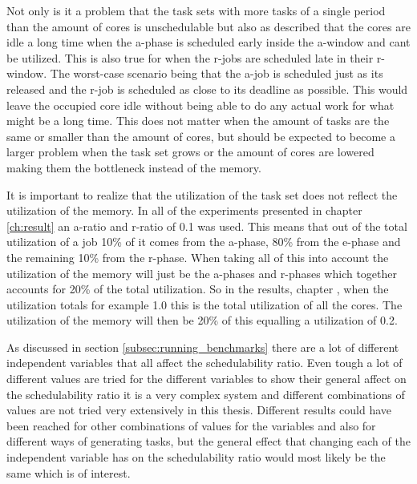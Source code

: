 \documentclass{kththesis}
\begin{document}
Not only is it a problem that the task sets with more tasks of a single period than the amount of
cores is unschedulable but also as described that the cores are idle a long time when the
\acrshort{a}-phase is scheduled early inside the \acrshort{a}-window and cant be utilized. This is
also true for when the \acrshort{r}-jobs are scheduled late in their \acrshort{r}-window. The
worst-case scenario being that the \acrshort{a}-job is scheduled just as its released and the
\acrshort{r}-job is scheduled as close to its deadline as possible. This would leave the occupied
core idle without being able to do any actual work for what might be a long time. This does not
matter when the amount of tasks are the same or smaller than the amount of cores, but should be
expected to become a larger problem when the task set grows or the amount of cores are lowered
making them the bottleneck instead of the memory.

It is important to realize that the utilization of the task set does not reflect the utilization of
the memory. In all of the experiments presented in chapter \ref{ch:result} an \acrshort{a}-ratio and
\acrshort{r}-ratio of 0.1 was used. This means that out of the total utilization of a job 10\% of it
comes from the \acrshort{a}-phase, 80\% from the \acrshort{e}-phase and the remaining 10\% from the
\acrshort{r}-phase. When taking all of this into account the utilization of the memory will just be
the \acrshort{a}-phases and \acrshort{r}-phases which together accounts for 20\% of the total
utilization. So in the results, chapter \label{ch:results}, when the utilization totals for
example 1.0 this is the total utilization of all the cores. The utilization of the memory will then
be 20\% of this equalling a utilization of 0.2.

As discussed in section \ref{subsec:running_benchmarks} there are a lot of different independent
variables that all affect the schedulability ratio. Even tough a lot of different values are tried
for the different variables to show their general affect on the schedulability ratio it is a very
complex system and different combinations of values are not tried very extensively in this thesis.
Different results could  have been reached for other combinations of values for the
variables and also for different ways of generating tasks, but the general effect that changing each
of the independent variable has on the schedulability ratio would most likely be the same which is
of interest. 

\end{document}
